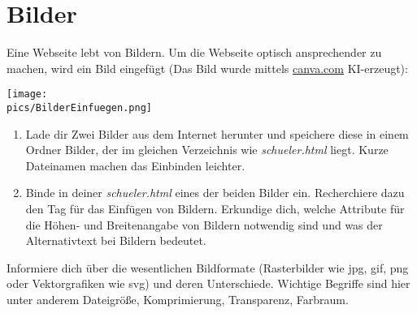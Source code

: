 \section{Bilder}
Eine Webseite lebt von Bildern. Um die Webseite optisch ansprechender zu machen, wird ein Bild eingefügt (Das Bild wurde mittels \href{https://www.canva.com/}{canva.com} KI-erzeugt):
\begin{minipage}[t]{\textwidth}
    \texttt{[image: \\pics/BilderEinfuegen.png]}
\end{minipage}
\begin{Exercise}[title=, label=Bilder]
    \begin{enumerate}
        \item Lade dir Zwei Bilder aus dem Internet herunter und speichere diese in einem Ordner Bilder, der im gleichen Verzeichnis wie \textit{schueler.html} liegt. Kurze Dateinamen machen das Einbinden leichter.
        \item Binde in deiner \textit{schueler.html} eines der beiden Bilder ein. Recherchiere dazu den Tag für das Einfügen von Bildern. Erkundige dich, welche Attribute für die Höhen- und Breitenangabe von Bildern notwendig sind und was der Alternativtext bei Bildern bedeutet.
    \end{enumerate}
    Informiere dich über die wesentlichen Bildformate (Rasterbilder wie jpg, gif, png oder Vektorgrafiken wie svg) und deren Unterschiede. Wichtige Begriffe sind hier unter anderem Dateigröße, Komprimierung, Transparenz, Farbraum.
\end{Exercise}


